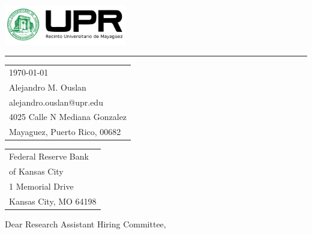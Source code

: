 \documentclass{article}
\begin{document}

\includegraphics[width=0.4\textwidth]{../assets/logo.png} %

\vspace{-1em} %

\rule{\linewidth}{1pt} %

\bigskip\bigskip %


\hfill
\begin{tabular}{l @{}}
\hfill \today \bigskip\\ %
\hfill Alejandro M. Ouslan \\
\hfill alejandro.ouslan@upr.edu \\
\hfill 4025 Calle N Mediana Gonzalez\\
\hfill Mayaguez, Puerto Rico, 00682 \\
\end{tabular}

\bigskip %


\begin{tabular}{@{} l}
Federal Reserve Bank \\ 
of Kansas City \\
1 Memorial Drive \\
Kansas City, MO 64198 \\
\end{tabular}


\bigskip %

Dear Research Assistant Hiring Committee,

\bigskip %
\end{document}
